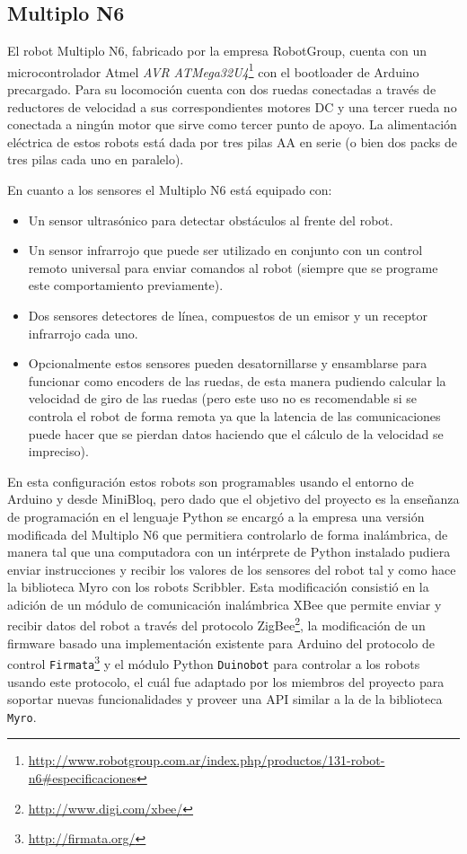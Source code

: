 \subsection{Multiplo N6}
El robot Multiplo N6, fabricado por la empresa RobotGroup, cuenta con un
microcontrolador Atmel
\textit{AVR ATMega32U4}\footnote{\url{http://www.robotgroup.com.ar/index.php/productos/131-robot-n6\#especificaciones}}
con el bootloader de Arduino
precargado. Para su locomoción cuenta con dos ruedas conectadas a través
de reductores de velocidad a sus correspondientes motores DC y una tercer
rueda no conectada a ningún motor que sirve como tercer punto de apoyo.
La alimentación eléctrica de estos robots está dada por tres pilas AA
en serie (o bien dos packs de tres pilas cada uno en paralelo).

En cuanto a los sensores el Multiplo N6 está equipado con:
\begin{itemize}
    \item Un sensor ultrasónico para detectar obstáculos al frente del
        robot.
    \item Un sensor infrarrojo que puede ser utilizado en conjunto con
        un control remoto universal para enviar comandos al robot
        (siempre que se programe este comportamiento previamente).
    \item Dos sensores detectores de línea, compuestos de un emisor y
        un receptor infrarrojo cada uno.
    \item Opcionalmente estos sensores pueden desatornillarse y ensamblarse
        para funcionar como encoders de las ruedas, de esta manera pudiendo
        calcular la velocidad de giro de las ruedas (pero este uso
        no es recomendable si se controla el robot de forma remota
        ya que la latencia de las comunicaciones puede hacer que se pierdan
        datos haciendo que el cálculo de la velocidad se impreciso).
\end{itemize}

En esta configuración estos robots son programables usando el entorno de
Arduino y desde MiniBloq, pero dado que el objetivo del proyecto es la enseñanza de
programación en el lenguaje Python se encargó a la empresa una versión
modificada del Multiplo N6 que permitiera controlarlo de forma inalámbrica,
de manera tal que una computadora con un intérprete de Python instalado
pudiera enviar instrucciones y recibir los valores de los sensores
del robot tal y como hace la biblioteca Myro con los robots Scribbler.
Esta
modificación consistió en la adición de un módulo de comunicación inalámbrica
XBee que permite enviar y recibir datos del robot a través del protocolo
ZigBee\footnote{\url{http://www.digi.com/xbee/}}, la modificación de
un firmware basado una implementación existente para Arduino del protocolo
de control \texttt{Firmata}\footnote{\url{http://firmata.org/}} y
el módulo Python \texttt{Duinobot} para controlar a los robots usando
este protocolo, el
cuál fue adaptado por los miembros del proyecto \proyecto{}
para soportar nuevas funcionalidades y proveer una
API similar a la de la biblioteca
\texttt{Myro}\citep{lanfranco_2012}.

